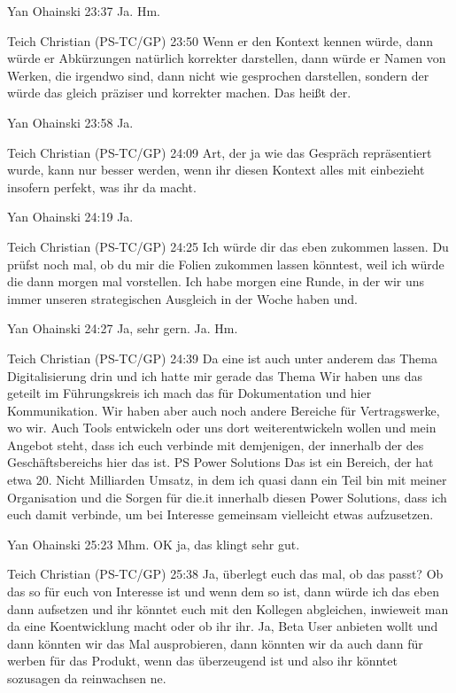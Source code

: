 Yan Ohainski   23:37
Ja.
Hm.

Teich Christian (PS-TC/GP)   23:50
Wenn er den Kontext kennen würde, dann würde er Abkürzungen natürlich korrekter darstellen, dann würde er Namen von Werken, die irgendwo sind, dann nicht wie gesprochen darstellen, sondern der würde das gleich präziser und korrekter machen. Das heißt der.

Yan Ohainski   23:58
Ja.

Teich Christian (PS-TC/GP)   24:09
Art, der ja wie das Gespräch repräsentiert wurde, kann nur besser werden, wenn ihr diesen Kontext alles mit einbezieht insofern perfekt, was ihr da macht.

Yan Ohainski   24:19
Ja.

Teich Christian (PS-TC/GP)   24:25
Ich würde dir das eben zukommen lassen. Du prüfst noch mal, ob du mir die Folien zukommen lassen könntest, weil ich würde die dann morgen mal vorstellen. Ich habe morgen eine Runde, in der wir uns immer unseren strategischen Ausgleich in der Woche haben und.

Yan Ohainski   24:27
Ja, sehr gern.
Ja.
Hm.

Teich Christian (PS-TC/GP)   24:39
Da eine ist auch unter anderem das Thema Digitalisierung drin und ich hatte mir gerade das Thema Wir haben uns das geteilt im Führungskreis ich mach das für Dokumentation und hier Kommunikation. Wir haben aber auch noch andere Bereiche für Vertragswerke, wo wir.
Auch Tools entwickeln oder uns dort weiterentwickeln wollen und mein Angebot steht, dass ich euch verbinde mit demjenigen, der innerhalb der des Geschäftsbereichs hier das ist. PS Power Solutions Das ist ein Bereich, der hat etwa 20.
Nicht Milliarden Umsatz, in dem ich quasi dann ein Teil bin mit meiner Organisation und die Sorgen für die.it innerhalb diesen Power Solutions, dass ich euch damit verbinde, um bei Interesse gemeinsam vielleicht etwas aufzusetzen.

Yan Ohainski   25:23
Mhm.
OK ja, das klingt sehr gut.

Teich Christian (PS-TC/GP)   25:38
Ja, überlegt euch das mal, ob das passt? Ob das so für euch von Interesse ist und wenn dem so ist, dann würde ich das eben dann aufsetzen und ihr könntet euch mit den Kollegen abgleichen, inwieweit man da eine Koentwicklung macht oder ob ihr ihr.
Ja, Beta User anbieten wollt und dann könnten wir das Mal ausprobieren, dann könnten wir da auch dann für werben für das Produkt, wenn das überzeugend ist und also ihr könntet sozusagen da reinwachsen ne.


